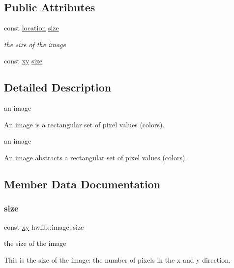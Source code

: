 \subsection*{Public Attributes}
\begin{DoxyCompactItemize}
\item 
const \hyperlink{classhwlib_1_1location}{location} \hyperlink{classhwlib_1_1image_af98b91ebc4718e987918dae845691296}{size}
\begin{DoxyCompactList}\small\item\em the size of the image \end{DoxyCompactList}\item 
const \hyperlink{classhwlib_1_1xy}{xy} \hyperlink{classhwlib_1_1image_a0a1e860a5e8a40622fb78542f7eb811c}{size}
\end{DoxyCompactItemize}


\subsection{Detailed Description}
an image 

An image is a rectangular set of pixel values (colors).

an image

An image abstracts a rectangular set of pixel values (colors). 

\subsection{Member Data Documentation}
\mbox{\label{classhwlib_1_1image_a0a1e860a5e8a40622fb78542f7eb811c}} 
\subsubsection{\texorpdfstring{size}{size}\hspace{0.1cm}{\footnotesize\ttfamily [1/2]}}
{\footnotesize\ttfamily const \hyperlink{classhwlib_1_1xy}{xy} hwlib\+::image\+::size}

the size of the image

This is the size of the image\+: the number of pixels in the x and y direction. \mbox{\label{classhwlib_1_1image_af98b91ebc4718e987918dae845691296}} 
